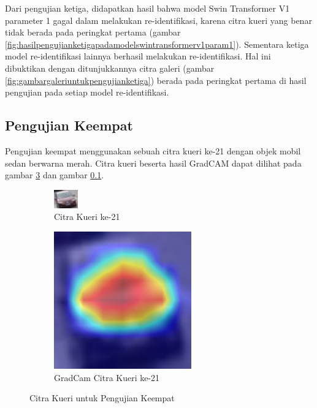 Dari pengujian ketiga, didapatkan hasil bahwa model Swin Transformer V1 parameter 1 gagal dalam melakukan re-identifikasi, 
karena citra kueri yang benar tidak berada pada peringkat pertama (gambar 
\ref{fig:hasilpengujianketigapadamodelswintransformerv1param1}). Sementara ketiga model re-identifikasi lainnya berhasil 
melakukan re-identifikasi. Hal ini dibuktikan dengan ditunjukkannya citra galeri (gambar \ref{fig:gambargaleriuntukpengujianketiga})
berada pada peringkat pertama di hasil pengujian pada setiap model re-identifikasi.

\subsection{Pengujian Keempat}

Pengujian keempat menggunakan sebuah citra kueri ke-21 dengan objek mobil sedan berwarna merah. Citra kueri 
beserta hasil GradCAM dapat dilihat pada gambar \ref{fig:gambarkueriuntukpengujiankeempat} dan gambar \ref{}.

\begin{figure}[h!]
  \centering
  \begin{subfigure}{.5\textwidth}
    \centering
    \includegraphics[width=.4\linewidth]{gambar/Que21_1046.jpg}
    \caption{Citra Kueri ke-21}
    \label{gambarkuerinomorduasatu}
  \end{subfigure}%
  \begin{subfigure}{.5\textwidth}
    \centering
    \includegraphics[width=.4\linewidth]{gambar/GradCamQue21_1046.jpg}
    \caption{GradCam Citra Kueri ke-21}
    \label{gradcamgambarkuerinomorduasatu}
  \end{subfigure}
  \caption{Citra Kueri untuk Pengujian Keempat}
  \label{fig:gambarkueriuntukpengujiankeempat}
\end{figure}

